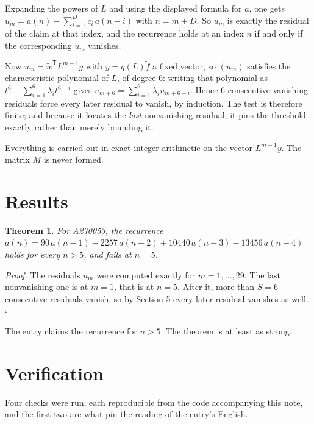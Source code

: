 \documentclass[11pt]{article}
\newtheorem{theorem}{Theorem}
\theoremstyle{definition}
\begin{document}
Expanding the powers of $L$ and using the displayed formula for $a$, one gets $u_m = a(n) - \sum_{i=1}^{D} c_i\,a(n-i)$ with $n = m + D$. So $u_m$ is exactly the residual of the claim at that index, and the recurrence holds at an index $n$ if and only if the corresponding $u_m$ vanishes.

Now $u_m = \tilde w^{\mathsf T} L^{m-1} y$ with $y = q(L)\tilde f$ a fixed vector, so $(u_m)$ satisfies the characteristic polynomial of $L$, of degree $6$: writing that polynomial as $t^{6} - \sum_{i=1}^{6} \lambda_i t^{6-i}$ gives $u_{m+6} = \sum_{i=1}^{6} \lambda_i u_{m+6-i}$. Hence $6$ consecutive vanishing residuals force every later residual to vanish, by induction. The test is therefore finite; and because it locates the {\itshape last} nonvanishing residual, it pins the threshold exactly rather than merely bounding it.

Everything is carried out in exact integer arithmetic on the vector $L^{m-1}y$. The matrix $M$ is never formed.

\section{Results}

\begin{theorem} For A270053, the recurrence $a(n) = 90\,a(n-1) - 2257\,a(n-2) + 10440\,a(n-3) - 13456\,a(n-4)$ holds for every $n > 5$, and fails at $n = 5$.\end{theorem}

{\itshape Proof.} The residuals $u_m$ were computed exactly for $m = 1,\dots,29$. The last nonvanishing one is at $m = 1$, that is at $n = 5$. After it, more than $S = 6$ consecutive residuals vanish, so by Section 5 every later residual vanishes as well. $\square$

The entry claims the recurrence for $n > 5$. The theorem is at least as strong.

\section{Verification}

Four checks were run, each reproducible from the code accompanying this note, and the first two are what pin the reading of the entry's English.
\end{document}
